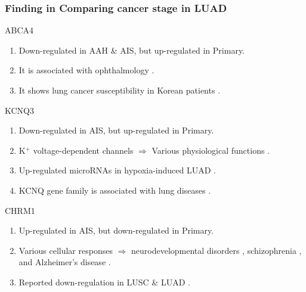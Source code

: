 \documentclass{beamer}
\begin{document}
    \begin{frame}[allowframebreaks]
        \frametitle{Finding in Comparing cancer stage in LUAD}

        \begin{block}{ABCA4}
            \begin{enumerate}
                \item Down-regulated in AAH \& AIS, but up-regulated in Primary.
                \item It is associated with ophthalmology \cite{ABCA4-2}.
                \item It shows lung cancer susceptibility in Korean patients \cite{ABCA4-1}.
            \end{enumerate}
        \end{block}

        \begin{block}{KCNQ3}
            \begin{enumerate}
                \item Down-regulated in AIS, but up-regulated in Primary.
                \item K$^+$ voltage-dependent channels $ \Rightarrow $ Various physiological functions \cite{KCNQ3-1, KCNQ3-2, KCNQ3-3}.
                \item Up-regulated microRNAs in hypoxia-induced LUAD \cite{KCNQ3-4}.
                \item KCNQ gene family is associated with lung diseases \cite{KCNQ3-5}.
            \end{enumerate}
        \end{block}

        \begin{block}{CHRM1}
            \begin{enumerate}
                \item Up-regulated in AIS, but down-regulated in Primary.
                \item Various cellular responses $\Rightarrow$ neurodevelopmental disorders \cite{CHRM1-1}, schizophrenia \cite{CHRM1-2}, and Alzheimer's disease \cite{CHRM1-3}.
                \item Reported down-regulation in LUSC \& LUAD \cite{CHRM1-4}.
            \end{enumerate}
        \end{block}
    \end{frame}
\end{document}
